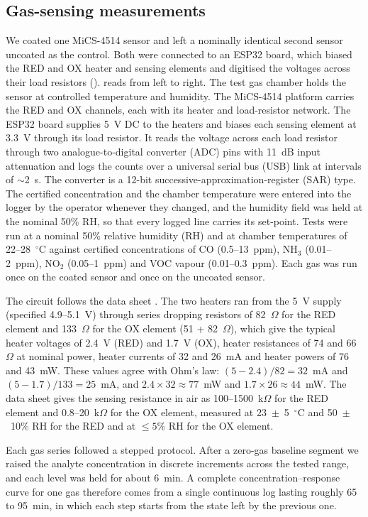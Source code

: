\documentclass[preprint,11pt]{elsarticle}
\begin{document}
\subsection{Gas-sensing measurements}
\label{sec:gas-methods}
We coated one MiCS-4514 sensor and left a nominally identical second sensor uncoated as the control. Both were connected to an ESP32 board, which biased the RED and OX heater and sensing elements and digitised the voltages across their load resistors ().  reads from left to right. The test gas chamber holds the sensor at controlled temperature and humidity. The MiCS-4514 platform carries the RED and OX channels, each with its heater and load-resistor network. The ESP32 board supplies 5~V DC to the heaters and biases each sensing element at 3.3~V through its load resistor. It reads the voltage across each load resistor through two analogue-to-digital converter (ADC) pins with 11~dB input attenuation and logs the counts over a universal serial bus (USB) link at intervals of $\sim$2~s. The converter is a 12-bit successive-approximation-register (SAR) type. The certified concentration and the chamber temperature were entered into the logger by the operator whenever they changed, and the humidity field was held at the nominal 50\% RH, so that every logged line carries its set-point. Tests were run at a nominal 50\% relative humidity (RH) and at chamber temperatures of 22--28~$^{\circ}$C against certified concentrations of CO (0.5--13~ppm), NH$_3$ (0.01--2~ppm), NO$_2$ (0.05--1~ppm) and VOC vapour (0.01--0.3~ppm). Each gas was run once on the coated sensor and once on the uncoated sensor.

The circuit follows the data sheet \cite{sgx2019mics4514}. The two heaters ran from the 5~V supply (specified 4.9--5.1~V) through series dropping resistors of 82~$\Omega$ for the RED element and 133~$\Omega$ for the OX element (51 + 82~$\Omega$), which give the typical heater voltages of 2.4~V (RED) and 1.7~V (OX), heater resistances of 74 and 66~$\Omega$ at nominal power, heater currents of 32 and 26~mA and heater powers of 76 and 43~mW. These values agree with Ohm's law: $(5-2.4)/82 = 32$~mA and $(5-1.7)/133 = 25$~mA, and $2.4\times 32\approx 77$~mW and $1.7\times 26\approx 44$~mW. The data sheet gives the sensing resistance in air as 100--1500~k$\Omega$ for the RED element and 0.8--20~k$\Omega$ for the OX element, measured at 23~$\pm$~5~$^{\circ}$C and 50~$\pm$~10\% RH for the RED and at $\leq 5$\% RH for the OX element.

Each gas series followed a stepped protocol. After a zero-gas baseline segment we raised the analyte concentration in discrete increments across the tested range, and each level was held for about 6~min. A complete concentration--response curve for one gas therefore comes from a single continuous log lasting roughly 65 to 95~min, in which each step starts from the state left by the previous one.
\end{document}
